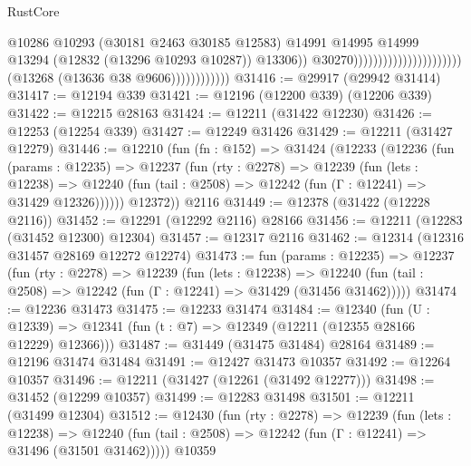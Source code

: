\begin{lexlean}{RustCore}
\begin{coremodule}
                                                                        @10286
                                                                        @10293
                                                                        (@30181 @2463 @30185 @12583)
                                                                        @14991
                                                                        @14995
                                                                        @14999
                                                                        @13294
                                                                        (@12832
                                                                          (@13296 @10293 @10287))
                                                                        @13306))
                                                                    @30270))))))))))))))))))))))
                        (@13268 (@13636 @38 @9606))))))))))))
@31416 := @29917 (@29942 @31414)
@31417 := @12194 @339
@31421 := @12196 (@12200 @339) (@12206 @339)
@31422 := @12215 @28163
@31424 := @12211 (@31422 @12230)
@31426 := @12253 (@12254 @339)
@31427 := @12249 @31426
@31429 := @12211 (@31427 @12279)
@31446 := @12210
    (fun (fn : @152) =>
    @31424
      (@12233
        (@12236
          (fun (params : @12235) =>
          @12237
            (fun (rty : @2278) =>
            @12239
              (fun (lets : @12238) =>
              @12240 (fun (tail : @2508) => @12242 (fun (Γ : @12241) => @31429 @12326))))))
        @12372))
    @2116
@31449 := @12378 (@31422 (@12228 @2116))
@31452 := @12291 (@12292 @2116) @28166
@31456 := @12211 (@12283 (@31452 @12300) @12304)
@31457 := @12317 @2116
@31462 := @12314 (@12316 @31457 @28169 @12272 @12274)
@31473 := fun (params : @12235) =>
  @12237
    (fun (rty : @2278) =>
    @12239
      (fun (lets : @12238) =>
      @12240 (fun (tail : @2508) => @12242 (fun (Γ : @12241) => @31429 (@31456 @31462)))))
@31474 := @12236 @31473
@31475 := @12233 @31474
@31484 := @12340
    (fun (U : @12339) => @12341 (fun (t : @7) => @12349 (@12211 (@12355 @28166 @12229) @12366)))
@31487 := @31449 (@31475 @31484) @28164
@31489 := @12196 @31474 @31484
@31491 := @12427 @31473 @10357
@31492 := @12264 @10357
@31496 := @12211 (@31427 (@12261 (@31492 @12277)))
@31498 := @31452 (@12299 @10357)
@31499 := @12283 @31498
@31501 := @12211 (@31499 @12304)
@31512 := @12430
    (fun (rty : @2278) =>
    @12239
      (fun (lets : @12238) =>
      @12240 (fun (tail : @2508) => @12242 (fun (Γ : @12241) => @31496 (@31501 @31462)))))
    @10359

\end{coremodule}
\end{lexlean}
